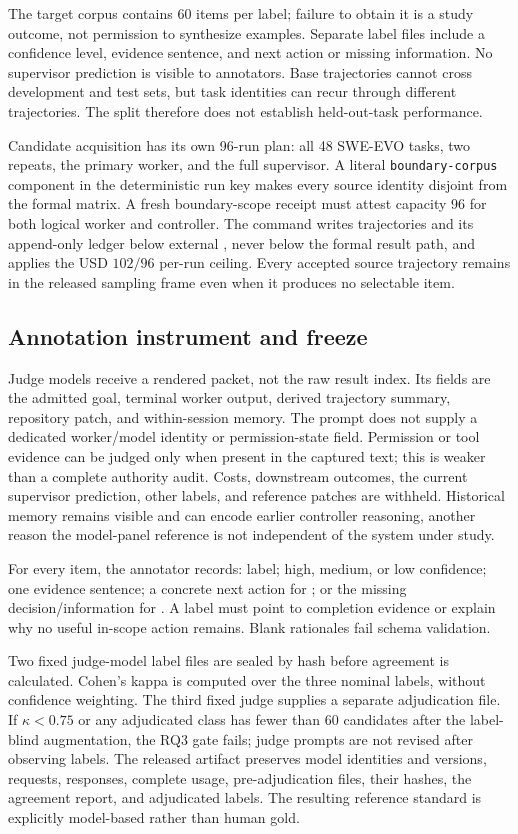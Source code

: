 The target corpus contains 60 items per label; failure to obtain it is a study outcome, not permission to synthesize examples. Separate label files include a confidence level, evidence sentence, and next action or missing information. No supervisor prediction is visible to annotators. Base trajectories cannot cross development and test sets, but task identities can recur through different trajectories. The split therefore does not establish held-out-task performance.

Candidate acquisition has its own 96-run plan: all 48 SWE-EVO tasks, two repeats, the primary worker, and the full supervisor. A literal \texttt{boundary-corpus} component in the deterministic run key makes every source identity disjoint from the formal matrix. A fresh boundary-scope receipt must attest capacity 96 for both logical worker and controller. The command writes trajectories and its append-only ledger below external , never below the formal result path, and applies the USD $102/96$ per-run ceiling. Every accepted source trajectory remains in the released sampling frame even when it produces no selectable item.

\subsection{Annotation instrument and freeze}

Judge models receive a rendered packet, not the raw result index. Its fields are the admitted goal, terminal worker output, derived trajectory summary, repository patch, and within-session memory. The prompt does not supply a dedicated worker/model identity or permission-state field. Permission or tool evidence can be judged only when present in the captured text; this is weaker than a complete authority audit. Costs, downstream outcomes, the current supervisor prediction, other labels, and reference patches are withheld. Historical memory remains visible and can encode earlier controller reasoning, another reason the model-panel reference is not independent of the system under study.

For every item, the annotator records: label; high, medium, or low confidence; one evidence sentence; a concrete next action for \continueaction{}; or the missing decision/information for . A \stopaction{} label must point to completion evidence or explain why no useful in-scope action remains. Blank rationales fail schema validation.

Two fixed judge-model label files are sealed by hash before agreement is calculated. Cohen's kappa is computed over the three nominal labels, without confidence weighting. The third fixed judge supplies a separate adjudication file. If $\kappa<0.75$ or any adjudicated class has fewer than 60 candidates after the label-blind augmentation, the RQ3 gate fails; judge prompts are not revised after observing labels. The released artifact preserves model identities and versions, requests, responses, complete usage, pre-adjudication files, their hashes, the agreement report, and adjudicated labels. The resulting reference standard is explicitly model-based rather than human gold.

